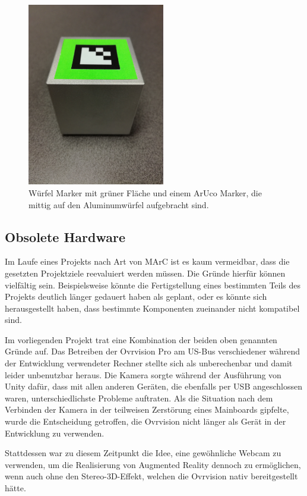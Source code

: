 	\begin{figure}[H] 
	\center 
	\includegraphics[trim = 0mm 280mm 0mm 150mm, clip, width=6cm]{Bilder/tracking-marker.jpg}			
	\caption{Würfel Marker mit grüner Fläche und einem ArUco Marker, die mittig auf den Aluminumwürfel aufgebracht sind.}
	\label{fig:marker}
\end{figure}


	
\subsection{Obsolete Hardware}\label{sec:obsoleteHardware}
Im Laufe eines Projekts nach Art von MArC ist es kaum vermeidbar, dass die gesetzten Projektziele reevaluiert werden müssen. Die Gründe hierfür können vielfältig sein. Beispielsweise könnte die Fertigstellung eines bestimmten Teils des Projekts deutlich länger gedauert haben als geplant, oder es könnte sich herausgestellt haben, dass bestimmte Komponenten zueinander nicht kompatibel sind.

Im vorliegenden Projekt trat eine Kombination der beiden oben genannten Gründe auf. Das Betreiben der Ovrvision Pro am US-Bus verschiedener während der Entwicklung verwendeter Rechner stellte sich als unberechenbar und damit leider unbenutzbar heraus. Die Kamera sorgte während der Ausführung von Unity dafür, dass mit allen anderen Geräten, die ebenfalls per USB angeschlossen waren, unterschiedlichste Probleme auftraten. Als die Situation nach dem Verbinden der Kamera in der teilweisen Zerstörung eines Mainboards gipfelte, wurde die Entscheidung getroffen, die Ovrvision nicht länger als Gerät in der Entwicklung zu verwenden.

Stattdessen war zu diesem Zeitpunkt die Idee, eine gewöhnliche Webcam zu verwenden, um die Realisierung von Augmented Reality dennoch zu ermöglichen, wenn auch ohne den Stereo-3D-Effekt, welchen die Ovrvision nativ bereitgestellt hätte.

